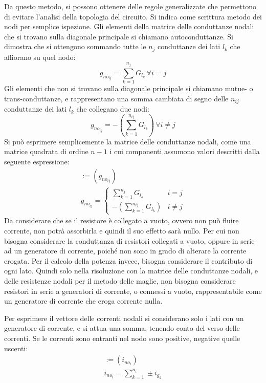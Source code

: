 \documentclass{article}
\numberwithin{equation}{subsection}
\begin{document}
Da questo metodo, si possono ottenere delle regole generalizzate che permettono di evitare l'analisi della topologia del circuito. Si indica come scrittura metodo dei nodi 
per semplice ispezione. Gli elementi della matrice delle conduttanze nodali che si trovano sulla diagonale principale si chiamano autoconduttanze. Si dimostra che si ottengono 
sommando tutte le $n_{j}$ conduttanze dei lati $l_k$ che affiorano su quel nodo:
\begin{equation*}
    g_{{no}_{ij}}=\displaystyle\sum_{k=1}^{n_j}G_{l_k}\,\forall i= j
\end{equation*}
Gli elementi che non si trovano sulla diagonale principale si chiamano mutue- o trans-conduttanze, e rappresentano una somma cambiata di segno delle $n_{ij}$ conduttanze dei lati 
$l_k$ che collegano due nodi:
\begin{equation*}
    g_{{no}_{ij}}=-\displaystyle\left(\sum_{k=1}^{n_{ij}}G_{l_k}\right)\,\forall i\neq j
\end{equation*}
Si può esprimere semplicemente la matrice delle conduttanze nodali, come una matrice quadrata di ordine $n-1$ i cui componenti assumono valori descritti dalla seguente 
espressione: 
\begin{gather*}
    [G_{no}]:=(g_{{no}_{ij}})\\
    g_{{no}_{ij}}=\begin{cases}
        \displaystyle\sum_{k=1}^{n_j}G_{l_k} &i=j\\
        -\displaystyle\left(\sum_{k=1}^{n_{ij}}G_{l_k}\right)&i\neq j
    \end{cases}
\end{gather*}
Da considerare che se il resistore è collegato a vuoto, ovvero non può fluire corrente, non potrà assorbirla e quindi il suo effetto sarà nullo. Per cui non bisogna considerare 
la conduttanza di resistori collegati a vuoto, oppure in serie ad un generatore di corrente, poiché non sono in grado di alterare la corrente erogata. Per il calcolo della potenza 
invece, bisogna considerare il contributo di ogni lato. Quindi solo nella risoluzione con la matrice delle conduttanze nodali, e delle resistenze nodali per il metodo 
delle maglie, non bisogna considerare resistori in serie a generatori di corrente, o connessi a vuoto, rappresentabile come un generatore di corrente che eroga corrente nulla. 


Per esprimere il vettore delle correnti nodali si considerano solo i lati con un generatore di corrente, e si attua una somma, tenendo conto del verso delle correnti. 
Se le correnti sono entranti nel nodo sono positive, negative quelle uscenti: 
\begin{gather*}
    [I_{no}]:=(i_{{no}_{i}})\\
    i_{{no}_i}=\displaystyle\sum_{k=1}^{n_i}\pm i_{g_k}
\end{gather*}
\end{document}

